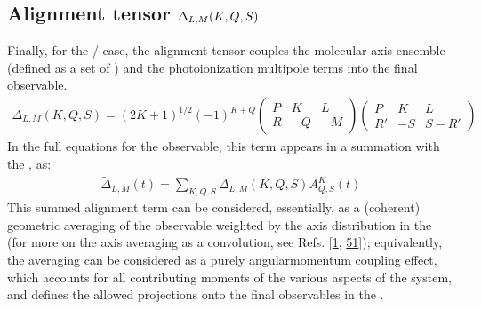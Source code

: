 \documentclass[letterpaper,table,10pt,english]{jupyterBook}
\begin{document}
\subsection{Alignment tensor \protect\(\Delta_{L,M}(K,Q,S)\protect\)}
\label{\detokenize{part1/theory_tensor_formalism_201122:alignment-tensor-delta-l-m-k-q-s}}\label{\detokenize{part1/theory_tensor_formalism_201122:sec-theory-af-alignment-term}}
\sphinxAtStartPar
Finally, for the {\hyperref[\detokenize{backmatter/glossary:term-LF}]{}}/{\hyperref[\detokenize{backmatter/glossary:term-AF}]{}} case, the alignment tensor couples the molecular axis ensemble (defined as a set of {\hyperref[\detokenize{backmatter/glossary:term-ADMs}]{}}) and the photoionization multipole terms into the final observable.
\begin{equation}\label{equation:part1/theory_tensor_formalism_201122:eq:basis-alignmentTensor-defn}
\begin{split}
\Delta_{L,M}(K,Q,S)=(2K+1)^{1/2}(-1)^{K+Q}\left(\begin{array}{ccc}
P & K & L\\
R & -Q & -M
\end{array}\right)\left(\begin{array}{ccc}
P & K & L\\
R' & -S & S-R'
\end{array}\right)
\end{split}
\end{equation}
\sphinxAtStartPar
In the full equations for the observable, this term appears in a summation with the {\hyperref[\detokenize{backmatter/glossary:term-ADMs}]{}}, as:
\begin{equation}\label{equation:part1/theory_tensor_formalism_201122:eq:basis-aligmentTerm-defn}
\begin{split}
\tilde{\Delta}_{L,M}(t) = \sum_{K,Q,S}\Delta_{L,M}(K,Q,S)A_{Q,S}^{K}(t)
\end{split}
\end{equation}
\sphinxAtStartPar
This summed alignment term can be considered, essentially, as a (coherent) geometric averaging of the {\hyperref[\detokenize{backmatter/glossary:term-MF}]{}} observable weighted by the axis distribution in the {\hyperref[\detokenize{backmatter/glossary:term-AF}]{}} (for more on the axis averaging as a convolution, see Refs. {[}\hyperlink{cite.backmatter/bibliography:id569}{1}, \hyperlink{cite.backmatter/bibliography:id785}{51}{]}); equivalently, the averaging can be considered as a purely angular\sphinxhyphen{}momentum coupling effect, which accounts for all contributing moments of the various aspects of the system, and defines the allowed projections onto the final observables in the {\hyperref[\detokenize{backmatter/glossary:term-LF}]{}}.
\end{document}
